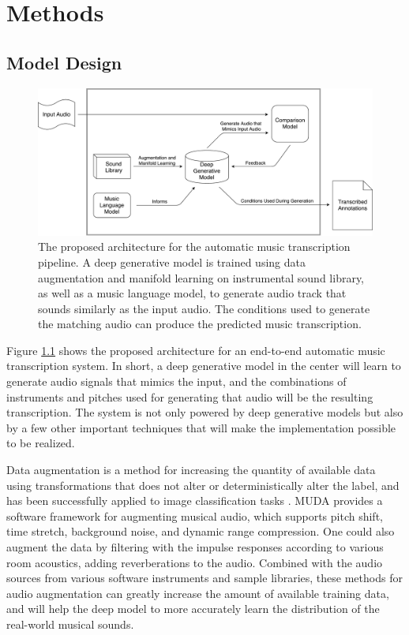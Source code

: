 
\graphicspath{{4-methods/figures/}}
\chapter{Methods}
\label{ch:methods}

\section{Model Design}

\begin{figure}
	\includegraphics[width=\textwidth]{grand.pdf}
	\caption{The proposed architecture for the automatic music transcription pipeline. A deep generative model is trained using data augmentation and manifold learning on instrumental sound library, as well as a music language model, to generate audio track that sounds similarly as the input audio. The conditions used to generate the matching audio can produce the predicted music transcription.}\label{fig:grand}
\end{figure}

Figure \ref{fig:grand} shows the proposed architecture for an end-to-end automatic music transcription system.
In short, a deep generative model in the center will learn to generate audio signals that mimics the input, and the combinations of instruments and pitches used for generating that audio will be the resulting transcription.
The system is not only powered by deep generative models but also by a few other important techniques that will make the implementation possible to be realized.

Data augmentation is a method for increasing the quantity of available data using transformations that does not alter or deterministically alter the label, and has been successfully applied to image classification tasks  \cite{krizhevsky2012imagenet}. MUDA \cite{mcfee2015muda} provides a software framework for augmenting musical audio, which supports pitch shift, time stretch, background noise, and dynamic range compression.
One could also augment the data by filtering with the impulse responses according to various room acoustics, adding reverberations to the audio.
Combined with the audio sources from various software instruments and sample libraries, these methods for audio augmentation can greatly increase the amount of available training data, and will help the deep model to more accurately learn the distribution of the real-world musical sounds.

